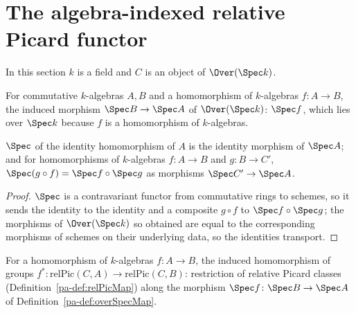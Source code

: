 \section{The algebra-indexed relative Picard functor}

In this section \(k\) is a field and \(C\) is an object of \(\Over(\Spec k)\).

\begin{definition}
  \label{pa-def:overSpecMap}
  \leanok

  For commutative \(k\)-algebras \(A, B\) and a homomorphism of \(k\)-algebras
  \(f \colon A \to B\), the induced morphism \(\Spec B \to \Spec A\) of \(\Over(\Spec k)\):
  \(\Spec f\), which lies over \(\Spec k\) because \(f\) is a homomorphism of \(k\)-algebras.
\end{definition}

\begin{lemma}
  \label{pa-lem:overSpecMap_functor}
  \leanok

  \(\Spec\) of the identity homomorphism of \(A\) is the identity morphism of \(\Spec A\); and
  for homomorphisms of \(k\)-algebras \(f \colon A \to B\) and \(g \colon B \to C'\),
  \(\Spec(g \circ f) = \Spec f \circ \Spec g\) as morphisms \(\Spec C' \to \Spec A\).
\end{lemma}
\begin{proof}
  \leanok
  \(\Spec\) is a contravariant functor from commutative rings to schemes, so it sends the
  identity to the identity and a composite \(g \circ f\) to \(\Spec f \circ \Spec g\); the
  morphisms of \(\Over(\Spec k)\) so obtained are equal to the corresponding morphisms of
  schemes on their underlying data, so the identities transport.
\end{proof}

\begin{definition}
  \label{pa-def:relPicAlgMap}
  \leanok

  For a homomorphism of \(k\)-algebras \(f \colon A \to B\), the induced homomorphism of groups
  \(f^{*} \colon \mathrm{relPic}(C,A) \to \mathrm{relPic}(C,B)\): restriction of relative
  Picard classes (Definition~\ref{pa-def:relPicMap}) along the morphism
  \(\Spec f \colon \Spec B \to \Spec A\) of Definition~\ref{pa-def:overSpecMap}.
\end{definition}

